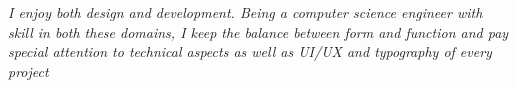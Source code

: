 \cventry{}
    {}
    {}
    {\textit{I enjoy both design and development. Being a computer science engineer with skill in both these domains, I keep the balance between form and function and pay special attention to technical aspects as well as UI/UX and typography of every project}}
    {}
    {}
    \vspace*{0.2\baselineskip}

